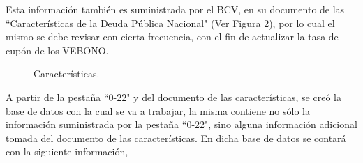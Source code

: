 \vspace{0.5cm}

\hspace{0.4cm}Esta informaci\'on tambi\'en es suministrada por el BCV, en su documento de las ``Caracter\'isticas de la Deuda P\'ublica Nacional" (Ver Figura 2), por lo cual el mismo se debe revisar con cierta frecuencia, con el fin de actualizar la tasa de cup\'on de los VEBONO.


\begin{figure}[h]
\caption{Caracter\'isticas.}
\end{figure}


\hspace{0.4cm} A partir de la pesta\~na ``0-22"\hspace{0.01cm} y del documento de las caracter\'isticas, se cre\'o la base de datos con la cual se va a trabajar, la misma contiene no s\'olo la informaci\'on suministrada por la pesta\~na ``0-22", sino alguna informaci\'on adicional tomada del documento de las caracter\'isticas. En dicha base de datos se contar\'a con la siguiente informaci\'on,

\vspace{0.5cm}

